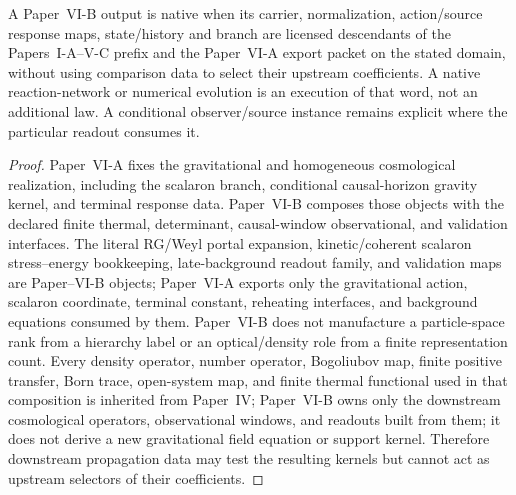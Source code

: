 \documentclass[12pt,a4paper]{article}
\begin{document}
\begin{theorem}
\label{p9:thm:second-dependency-criterion}
A Paper~VI-B output is native when its carrier, normalization, action/source
response maps, state/history and branch are licensed descendants of the
Papers~I-A--V-C prefix and the Paper~VI-A export packet on the stated domain,
without using comparison data to select their upstream coefficients.
A native reaction-network or numerical evolution is an execution of that
word, not an additional law.  A conditional observer/source instance remains
explicit where the particular readout consumes it.
\end{theorem}

\begin{proof}
Paper~VI-A fixes the gravitational and homogeneous cosmological realization, including the scalaron branch, conditional causal-horizon gravity kernel, and terminal response data.  Paper~VI-B composes those objects with the declared finite thermal, determinant, causal-window observational, and validation interfaces.  The literal RG/Weyl portal expansion, kinetic/coherent scalaron stress--energy
bookkeeping, late-background readout family, and validation maps are Paper--VI-B
objects; Paper~VI-A exports only the gravitational action, scalaron coordinate,
terminal constant, reheating interfaces, and background equations consumed by
them.  Paper~VI-B does not manufacture a particle-space rank from a hierarchy
label or an optical/density role from a finite representation count.  Every density operator, number operator, Bogoliubov map, finite positive transfer, Born trace, open-system map, and finite thermal functional used in that composition is inherited from Paper~IV; Paper~VI-B owns only the downstream cosmological operators, observational windows, and readouts built from them; it does not derive a new gravitational field equation or support kernel.  Therefore downstream propagation data may test the resulting kernels but cannot act as upstream selectors of their coefficients.
\end{proof}
\end{document}
